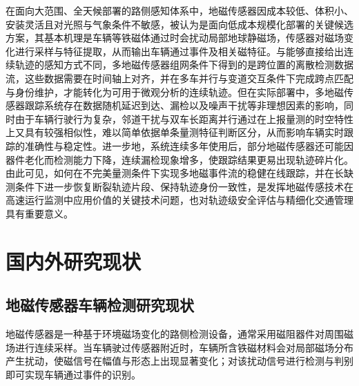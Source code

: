 \documentclass{xdupgthesis}
\begin{document}
在面向大范围、全天候部署的路侧感知体系中，地磁传感器因成本较低、体积小、安装灵活且对光照与气象条件不敏感，被认为是面向低成本规模化部署的关键候选方案，其基本机理是车辆等铁磁体通过时会扰动局部地球静磁场，传感器对磁场变化进行采样与特征提取，从而输出车辆通过事件及相关磁特征\cite{culik2023wirelessmagnetic}。与能够直接给出连续轨迹的感知方式不同，多地磁传感器组网条件下得到的是跨位置的离散检测数据流，这些数据需要在时间轴上对齐，并在多车并行与变道交互条件下完成跨点匹配与身份维护，才能转化为可用于微观分析的连续轨迹。但在实际部署中，多地磁传感器跟踪系统存在数据随机延迟到达、漏检以及噪声干扰等非理想因素的影响，同时由于车辆行驶行为复杂，邻道干扰与双车长距离并行通过在上报量测的时空特性上又具有较强相似性，难以简单依据单条量测特征判断区分，从而影响车辆实时跟踪的准确性与稳定性。进一步地，系统连续多年使用后，部分地磁传感器还可能因器件老化而检测能力下降，连续漏检现象增多，使跟踪结果更易出现轨迹碎片化\cite{rakai2022dataassociation,feng2021magneticdataassociation,wang2023distributedmagnetic}。由此可见，如何在不完美量测条件下实现多地磁事件流的稳健在线跟踪，并在长缺测条件下进一步恢复断裂轨迹片段、保持轨迹身份一致性，是发挥地磁传感技术在高速运行监测中应用价值的关键技术问题，也对轨迹级安全评估与精细化交通管理具有重要意义。

\section{国内外研究现状}

\subsection{地磁传感器车辆检测研究现状}
地磁传感器是一种基于环境磁场变化的路侧检测设备，通常采用磁阻器件对周围磁场进行连续采样。当车辆驶过传感器附近时，车辆所含铁磁材料会对局部磁场分布产生扰动，使磁信号在幅值与形态上出现显著变化；对该扰动信号进行检测与判别即可实现车辆通过事件的识别\cite{balid2018intelligent,feng2022magmonitor}。
\end{document}
